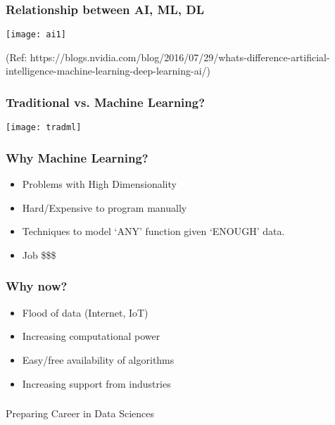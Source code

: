 \begin{frame}[fragile]\frametitle{Relationship between AI, ML, DL}
\begin{center}
\texttt{[image: ai1]}
\end{center}
{\tiny (Ref: https://blogs.nvidia.com/blog/2016/07/29/whats-difference-artificial-intelligence-machine-learning-deep-learning-ai/)}
\end{frame}




\begin{frame}[fragile]\frametitle{Traditional vs. Machine Learning?}
\begin{center}
\texttt{[image: tradml]}
\end{center}
\end{frame}

\begin{frame}[fragile]\frametitle{Why Machine Learning?}
\begin{itemize}
\item Problems with High Dimensionality
\item Hard/Expensive to program manually
\item Techniques to model `ANY' function given `ENOUGH' data.
\item Job \$\$\$
\end{itemize}
\end{frame}



\begin{frame}[fragile]\frametitle{Why now?}
\begin{itemize}
\item Flood of data (Internet, IoT)
\item Increasing computational power
\item Easy/free availability of algorithms 
\item Increasing support from industries
\end{itemize}
\end{frame}

\begin{frame}[fragile]\frametitle{}
\begin{center}
{\Large Preparing Career in Data Sciences}
\end{center}
\end{frame}

